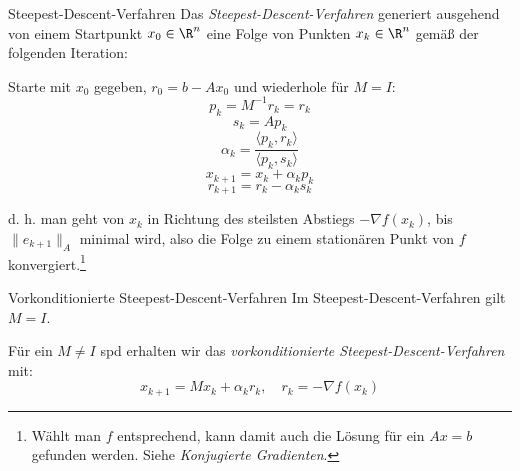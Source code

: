 \begin{defi}{Steepest-Descent-Verfahren}
    Das \emph{Steepest-Descent-Verfahren} generiert ausgehend von einem Startpunkt $x_0 \in \R^n$ eine Folge von Punkten $x_k \in \R^n$ gemäß der folgenden Iteration:

    Starte mit $x_0$ gegeben, $r_0 = b - Ax_0$ und wiederhole für $M = I$:
    \[
        p_k = M^{-1} r_k = r_k
    \]
    \[
        s_k = A p_k
    \]
    \[
        \alpha_k = \frac{\langle p_k, r_k \rangle}{\langle p_k, s_k \rangle}
    \]
    \[
        x_{k+1} = x_k + \alpha_k p_k
    \]
    \[
        r_{k+1} = r_k - \alpha_k s_k
    \]

    d. h. man geht von $x_k$ in Richtung des steilsten Abstiegs $-\nabla f(x_k)$, bis $\| e_{k+1} \|_A$ minimal wird, also die Folge zu einem stationären Punkt von $f$ konvergiert.\footnote{Wählt man $f$ entsprechend, kann damit auch die Lösung für ein $Ax = b$ gefunden werden. Siehe \emph{Konjugierte Gradienten}.}
\end{defi}

\begin{bonus}{Vorkonditionierte Steepest-Descent-Verfahren}
    Im Steepest-Descent-Verfahren gilt $M = I$.

    Für ein $M \neq I$ spd erhalten wir das \emph{vorkonditionierte Steepest-Descent-Verfahren} mit:
    \[
        x_{k+1} = M x_k + \alpha_k r_k, \quad r_k = - \nabla f(x_k)
    \]
\end{bonus}

